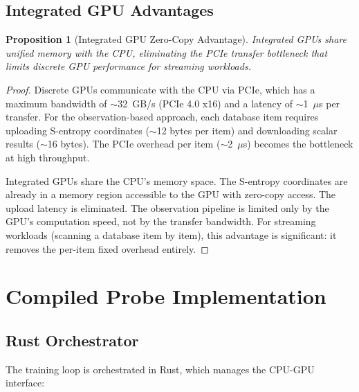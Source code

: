 \documentclass[11pt,twocolumn,a4paper]{article}
\newtheorem{proposition}[theorem]{Proposition}
\theoremstyle{definition}
\theoremstyle{remark}
\begin{document}
\subsection{Integrated GPU Advantages}

\begin{proposition}[Integrated GPU Zero-Copy Advantage]
\label{prop:zero_copy}
Integrated GPUs share unified memory with the CPU, eliminating the PCIe transfer bottleneck that limits discrete GPU performance for streaming workloads.
\end{proposition}

\begin{proof}
Discrete GPUs communicate with the CPU via PCIe, which has a maximum bandwidth of $\sim$32~GB/s (PCIe 4.0 x16) and a latency of $\sim$1~$\mu$s per transfer. For the observation-based approach, each database item requires uploading S-entropy coordinates ($\sim$12 bytes per item) and downloading scalar results ($\sim$16 bytes). The PCIe overhead per item ($\sim$2~$\mu$s) becomes the bottleneck at high throughput.

Integrated GPUs share the CPU's memory space. The S-entropy coordinates are already in a memory region accessible to the GPU with zero-copy access. The upload latency is eliminated. The observation pipeline is limited only by the GPU's computation speed, not by the transfer bandwidth. For streaming workloads (scanning a database item by item), this advantage is significant: it removes the per-item fixed overhead entirely.
\end{proof}


\section{Compiled Probe Implementation}
\label{sec:probe_impl}

\subsection{Rust Orchestrator}

The training loop is orchestrated in Rust, which manages the CPU-GPU interface:
\end{document}

